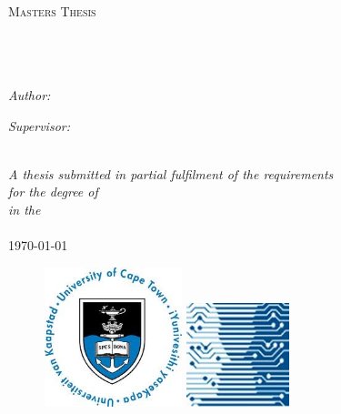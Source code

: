 \documentclass[11pt, a4paper, oneside]{Thesis} %
\begin{document}
\begin{titlepage}

\begin{center}

\textsc{\LARGE \univname}\\[1.5cm] %
\textsc{\Large Masters Thesis}\\[0.5cm] %

\HRule \\[0.4cm] %
{\huge \bfseries \ttitle}\\[0.4cm] %
\HRule \\[1.5cm] %
 
\begin{minipage}{0.4\textwidth}
\begin{flushleft} \large
\emph{Author:}\\
\authornames %
\end{flushleft}
\end{minipage}
\begin{minipage}{0.4\textwidth}
\begin{flushright} \large
\emph{Supervisor:} \\
\supname %
\end{flushright}
\end{minipage}\\[2cm]

\large \textit{A thesis submitted in partial fulfilment of the requirements\\ for the degree of \degreename}\\[0.3cm] %
\textit{in the}\\[0.4cm]
\deptname\\[2cm] %
{\large \today}\\[2cm] %
 \begin{figure}[h!]
 \centering
 \includegraphics[width=4cm]{Figures/uctlogo.jpg} 
 \hspace{2cm} 
 \includegraphics[width=3cm]{Figures/compsci.jpg}  
 \end{figure} 

\end{center}

\end{titlepage}
\end{document}
